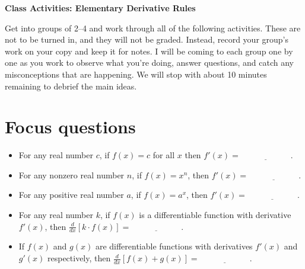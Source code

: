 \documentclass[11pt]{article}
\begin{document}
	
	\thispagestyle{empty}
	\renewcommand{\headrulewidth}{0.0pt}
	\thispagestyle{fancy}
	\lfoot{}
	\cfoot{}
	\rfoot{}	
	
	\vspace*{0in}

		\begin{center}
			\begin{large}
			\textbf{Class Activities: Elementary Derivative Rules} \\
			\end{large}
		\end{center}
	
Get into groups of 2--4 and work through all of the following activities. These are not to be turned in, and they will not be graded. Instead, record your group's work on your copy and keep it for notes. I will be coming to each group one by one as you work to observe what you're doing, answer questions, and catch any misconceptions that are happening. We will stop with about 10 minutes remaining to debrief the main ideas. \\

\section{Focus questions}

\begin{itemize}
	\item For any real number $c$, if $f(x) = c$ for all $x$ then $f'(x) = \underline{\hspace{1in}}$. 
	\item For any nonzero real number $n$, if $f(x) = x^n$, then $f'(x) = \underline{\hspace{1in}}$. 
	\item For any positive real number $a$, if $f(x) = a^x$, then $f'(x) = \underline{\hspace{1in}}$.
	\item For any real number $k$, if $f(x)$ is a differentiable function with derivative $f'(x)$, then $\frac{d}{dx}[k \cdot f(x) ] = \underline{\hspace{1in}}$. 
	\item If $f(x)$ and $g(x)$ are differentiable functions with derivatives $f'(x)$ and $g'(x)$ respectively, then $\frac{d}{dx}[f(x) + g(x)] = \underline{\hspace{1in}}$. 
\end{itemize}
\end{document}
